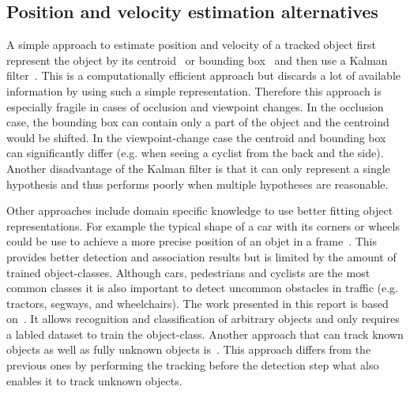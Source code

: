 \documentclass[twoside,a4paper,article]{combine}
\begin{document}
\subsection{Position and velocity estimation alternatives}
\label{sub:pos-vel-est-alt}
A simple approach to estimate position and velocity of a tracked
object first represent the object by its
centroid~\cite{kalman-centroid, towards-aut-cars} or bounding
box~\cite{kalman-bounding-box, kalman-bounding-box2,
  kalman-bounding-box3} and then use a Kalman
filter~\cite{ai-modern}. This is a computationally efficient approach
but discards a lot of available information by using such a simple
representation. Therefore this approach is especially fragile in cases
of occlusion and viewpoint changes. In the occlusion case, the
bounding box can contain only a part of the object and the centroind
would be shifted. In the viewpoint-change case the centroid and
bounding box can significantly differ (e.g. when seeing a cyclist from
the back and the side). Another disadvantage of the Kalman filter is
that it can only represent a single hypothesis and thus performs
poorly when multiple hypotheses are reasonable.

Other approaches include domain specific knowledge to use better
fitting object representations. For example the typical shape of a car
with its corners or wheels could be use to achieve a more precise
position of an objet in a frame~\cite{use-car-shape, use-car-shape2,
  use-car-shape3}. This provides better detection and association
results but is limited by the amount of trained
object-classes. Although cars, pedestrians and cyclists are the most
common classes it is also important to detect uncommon obstacles in
traffic (e.g. tractors, segways, and wheelchairs). The work presented
in this report is based on~\cite{arbitrary-object-recognition}. It
allows recognition and classification of arbitrary objects and only
requires a labled dataset to train the object-class. Another approach
that can track known objects as well as fully unknown objects
is~\cite{leibe-tracking-before-detection}. This approach differs from
the previous ones by performing the tracking before the detection
step what also enables it to track unknown objects.
\end{document}
